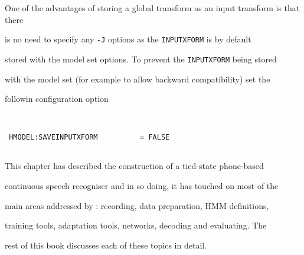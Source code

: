 One of the advantages of storing a global transform as an input transform is that there


is no need to specify any {\tt -J} options as the {\tt INPUTXFORM} is by default


stored with the model set options. To prevent the {\tt INPUTXFORM} being stored


with the model set (for example to allow backward compatibility) set the 


followin configuration option


\begin{verbatim}


 HMODEL:SAVEINPUTXFORM          = FALSE


\end{verbatim}







This chapter has described the construction of a tied-state phone-based


continuous speech recogniser and in so doing, it has touched on most of the


main areas addressed by \HTK: recording, data preparation, HMM definitions,


training tools, adaptation tools, networks, decoding and evaluating.  The 


rest of this book discusses each of these topics in detail.




















